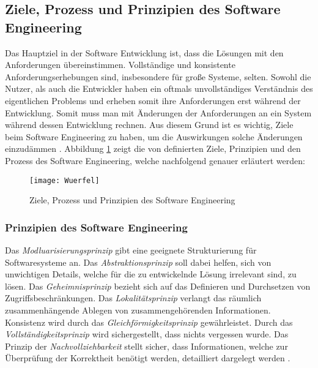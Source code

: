 \subsection{Ziele, Prozess und Prinzipien des Software Engineering}

Das Hauptziel in der Software Entwicklung ist, dass die Lösungen mit den Anforderungen übereinstimmen. Vollständige und konsistente Anforderungserhebungen sind, insbesondere für große Systeme, selten. Sowohl die Nutzer, als auch die Entwickler haben ein oftmals unvollständiges Verständnis des eigentlichen Problems und erheben somit ihre Anforderungen erst während der Entwicklung. Somit muss man mit Änderungen der Anforderungen an ein System während dessen Entwicklung rechnen. Aus diesem Grund ist es wichtig, Ziele beim Software Engineering zu haben, um die Auswirkungen solche Änderungen einzudämmen \cite{Booch1993}.
Abbildung  \ref{fig:Wuerfel} zeigt die von \cite{ross1975software} definierten Ziele, Prinzipien und den Prozess des Software Engineering, welche nachfolgend genauer erläutert werden: 

\begin{figure}[htp]
\begin{center}
  \texttt{[image: Wuerfel]} %
  \caption{Ziele, Prozess und Prinzipien des Software Engineering  \cite{ross1975software}}
  \label{fig:Wuerfel}
\end{center}
\end{figure}

\subsubsection{Prinzipien des Software Engineering}


 Das \textit{Modluarisierungsprinzip} gibt eine geeignete Strukturierung für Softwaresysteme an. Das \textit{Abstraktionsprinzip} soll dabei helfen, sich von unwichtigen Details, welche für die zu entwickelnde Lösung irrelevant sind, zu lösen. Das \textit{Geheimnisprinzip} bezieht sich auf das Definieren und Durchsetzen von Zugriffsbeschränkungen. Das \textit{Lokalitätsprinzip} verlangt das räumlich zusammenhängende Ablegen von zusammengehörenden Informationen. Konsistenz wird durch das \textit{Gleichförmigkeitsprinzip} gewährleistet. Durch das \textit{Vollständigkeitsprinzip} wird sichergestellt, dass nichts vergessen wurde. Das Prinzip der \textit{Nachvollziehbarkeit} stellt sicher, dass Informationen, welche zur Überprüfung der Korrektheit benötigt werden, detailliert dargelegt werden \cite{ross1975software}.
 
